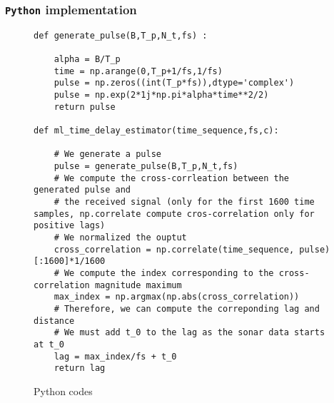 \documentclass[UKenglish,8pt,aspectratio=1610]{beamer}
\begin{document}
\begin{frame}[fragile]
	\frametitle{\texttt{Python} implementation}
	\begin{figure}[h!]
	\begin{lstlisting}[language=PythonPlus,style=colorEX]
def generate_pulse(B,T_p,N_t,fs) :
	
	alpha = B/T_p
	time = np.arange(0,T_p+1/fs,1/fs)
	pulse = np.zeros((int(T_p*fs)),dtype='complex')
	pulse = np.exp(2*1j*np.pi*alpha*time**2/2)
	return pulse
	
def ml_time_delay_estimator(time_sequence,fs,c):
	
	# We generate a pulse
	pulse = generate_pulse(B,T_p,N_t,fs)
	# We compute the cross-corrleation between the generated pulse and 
	# the received signal (only for the first 1600 time samples, np.correlate compute cros-correlation only for positive lags)
	# We normalized the ouptut
	cross_correlation = np.correlate(time_sequence, pulse)[:1600]*1/1600 
	# We compute the index corresponding to the cross-correlation magnitude maximum 
	max_index = np.argmax(np.abs(cross_correlation))
	# Therefore, we can compute the correponding lag and distance
	# We must add t_0 to the lag as the sonar data starts at t_0
	lag = max_index/fs + t_0
	return lag
\end{lstlisting}
\centering
\caption{Python codes}
	\end{figure}
\end{frame}
\end{document}

